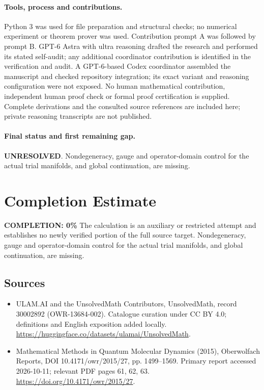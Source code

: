\documentclass[11pt]{article}
\begin{document}
\paragraph{Tools, process and contributions.}
Python 3 was used for file preparation and structural checks; no numerical experiment or theorem prover was used. Contribution prompt A was followed by prompt B. GPT-6 Astra with ultra reasoning drafted the research and performed its stated self-audit; any additional coordinator contribution is identified in the verification and audit. A GPT-6-based Codex coordinator assembled the manuscript and checked repository integration; its exact variant and reasoning configuration were not exposed. No human mathematical contribution, independent human proof check or formal proof certification is supplied. Complete derivations and the consulted source references are included here; private reasoning transcripts are not published.

\paragraph{Final status and first remaining gap.}
\textbf{UNRESOLVED}. Nondegeneracy, gauge and operator-domain control for the actual trial manifolds, and global continuation, are missing.

\section{Completion Estimate}
\noindent\textbf{COMPLETION: 0\%}
The calculation is an auxiliary or restricted attempt and establishes no newly verified portion of the full source target. Nondegeneracy, gauge and operator-domain control for the actual trial manifolds, and global continuation, are missing.

\subsection{Sources}
\begin{itemize}
\item[\hypertarget{source:30002892:1}{S1}] ULAM.AI and the UnsolvedMath Contributors, UnsolvedMath, record 30002892 (OWR-13684-002). Catalogue curation under CC BY 4.0; definitions and English exposition added locally.
\url{https://huggingface.co/datasets/ulamai/UnsolvedMath}.
\item[\hypertarget{source:30002892:2}{S2}] Mathematical Methods in Quantum Molecular Dynamics (2015), Oberwolfach Reports, DOI 10.4171/owr/2015/27, pp. 1499--1569. Primary report accessed 2026-10-11; relevant PDF pages 61, 62, 63.
\url{https://doi.org/10.4171/owr/2015/27}.
\end{itemize}
\label{end:30002892}
\end{document}
